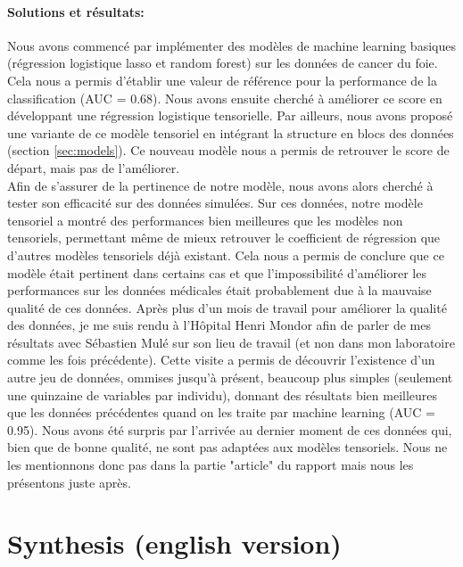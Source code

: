 \documentclass[preprint,12pt]{elsarticle}
\begin{document}
\paragraph*{Solutions et résultats:} Nous avons commencé par implémenter des modèles de machine learning basiques (régression logistique lasso et random forest) sur les données de cancer du foie. Cela nous a permis d'établir une valeur de référence pour la performance de la classification (AUC = 0.68). Nous avons ensuite cherché à améliorer ce score en développant une régression logistique tensorielle. Par ailleurs, nous avons proposé une variante de ce modèle tensoriel en intégrant la structure en blocs des données (section \ref{sec:models}). Ce nouveau modèle nous a permis de retrouver le score de départ, mais pas de l'améliorer.\\
\indent Afin de s'assurer de la pertinence de notre modèle, nous avons alors cherché à tester son efficacité sur des données simulées. Sur ces données, notre modèle tensoriel a montré des performances bien meilleures que les modèles non tensoriels, permettant même de mieux retrouver le coefficient de régression que d'autres modèles tensoriels déjà existant. Cela nous a permis de conclure que ce modèle était pertinent dans certains cas et que l'impossibilité d'améliorer les performances sur les données médicales était probablement due à la mauvaise qualité de ces données. Après plus d'un mois de travail pour améliorer la qualité des données, je me suis rendu à l'Hôpital Henri Mondor afin de parler de mes résultats avec Sébastien Mulé sur son lieu de travail (et non dans mon laboratoire comme les fois précédente). Cette visite a permis de découvrir l'existence d'un autre jeu de données, ommises jusqu'à présent, beaucoup plus simples (seulement une quinzaine de variables par individu), donnant des résultats bien meilleures que les données précédentes quand on les traite par machine learning (AUC = 0.95). Nous avons été surpris par l'arrivée au dernier moment de ces données qui, bien que de bonne qualité, ne sont pas adaptées aux modèles tensoriels. Nous ne les mentionnons donc pas dans la partie "article" du rapport mais nous les présentons juste après.\\

\newpage
\section*{Synthesis (english version)}
\vspace*{10 pt}
\end{document}
